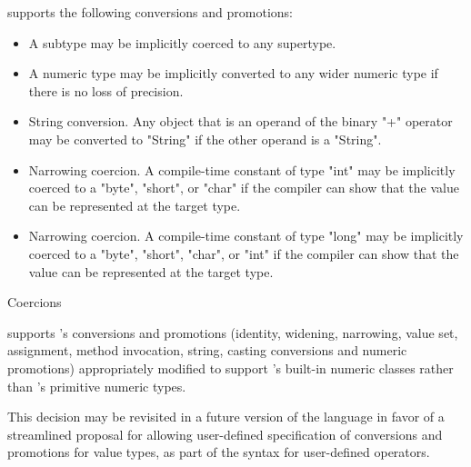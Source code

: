 \XtenCurrVer{} supports the following conversions and
promotions:
\begin{itemize}
\item A subtype may be implicitly coerced to any supertype.
\item A numeric type may be implicitly converted to any wider
numeric type if there is no loss of precision.
\item String conversion.  Any object that is an operand of the binary
\xcd"+" operator may
be converted to \xcd"String" if the other operand is a \xcd"String".
\item Narrowing coercion.  A compile-time constant of type \xcd"int" may be
implicitly coerced to a \xcd"byte", \xcd"short", or \xcd"char"
if the compiler can show that the value can be represented at
the target type.
\item Narrowing coercion.  A compile-time constant of type
\xcd"long" may be
implicitly coerced to a \xcd"byte", \xcd"short", \xcd"char",
or \xcd"int"
if the compiler can show that the value can be represented at
the target type.
\end{itemize}

Coercions

{}\XtenCurrVer{} supports \java's conversions and promotions
(identity, widening, narrowing, value set, assignment, method
invocation, string, casting conversions and numeric promotions)
appropriately modified to support \Xten's built-in numeric classes
rather than \java's primitive numeric types.

This decision may be revisited in a future version of the language in
favor of a streamlined proposal for allowing user-defined
specification of conversions and promotions for value types, as part
of the syntax for user-defined operators.

